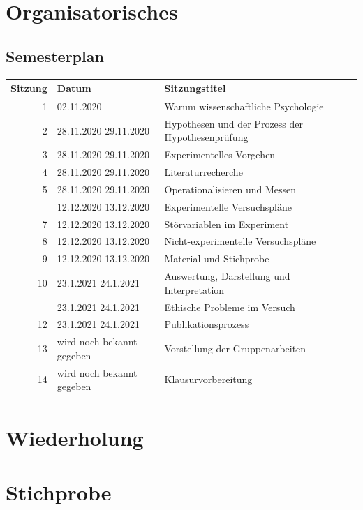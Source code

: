\documentclass[
]{book}
\begin{document}
\hypertarget{organisatorisches-8}{%
\section{Organisatorisches}\label{organisatorisches-8}}

\hypertarget{semesterplan-9}{%
\subsection{Semesterplan}\label{semesterplan-9}}

\begin{tabular}[t]{rll}
\toprule
Sitzung & Datum & Sitzungstitel\\
\midrule
1 & 02.11.2020 & Warum wissenschaftliche Psychologie\\
2 & 28.11.2020
29.11.2020 & Hypothesen und der Prozess der Hypothesenprüfung\\
3 & 28.11.2020
29.11.2020 & Experimentelles Vorgehen\\
4 & 28.11.2020
29.11.2020 & Literaturrecherche\\
5 & 28.11.2020
29.11.2020 & Operationalisieren und Messen\\
\addlinespace
6 & 12.12.2020
13.12.2020 & Experimentelle Versuchspläne\\
7 & 12.12.2020
13.12.2020 & Störvariablen im Experiment\\
8 & 12.12.2020
13.12.2020 & Nicht-experimentelle Versuchspläne\\
9 & 12.12.2020
13.12.2020 & Material und Stichprobe\\
10 & 23.1.2021
24.1.2021 & Auswertung, Darstellung und Interpretation\\
\addlinespace
11 & 23.1.2021
24.1.2021 & Ethische Probleme im Versuch\\
12 & 23.1.2021
24.1.2021 & Publikationsprozess\\
13 & wird noch bekannt gegeben & Vorstellung der Gruppenarbeiten\\
14 & wird noch bekannt gegeben & Klausurvorbereitung\\
\bottomrule
\end{tabular}

\hypertarget{wiederholung-7}{%
\section{Wiederholung}\label{wiederholung-7}}

\hypertarget{stichprobe}{%
\section{Stichprobe}\label{stichprobe}}
\end{document}
